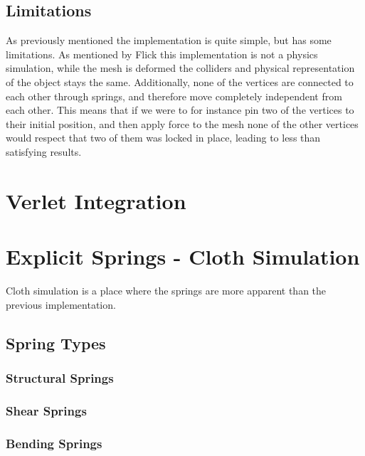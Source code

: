 \subsection{Limitations}
As previously mentioned the implementation is quite simple, but has some limitations. 
As mentioned by Flick\cite{catlike_mesh_deformation} this implementation is not a physics simulation, while the mesh is deformed
the colliders and physical representation of the object stays the same.
Additionally, none of the vertices are connected to each other through springs, and therefore move completely independent from each other. 
This means that if we were to for instance pin two of the vertices to their initial position, and then apply force to the mesh
none of the other vertices would respect that two of them was locked in place, leading to less than satisfying results.

\section{Verlet Integration}

\section{Explicit Springs - Cloth Simulation}
Cloth simulation is a place where the springs are more apparent than the previous implementation.

\subsection{Spring Types}
\subsubsection{Structural Springs}

\subsubsection{Shear Springs}

\subsubsection{Bending Springs}






